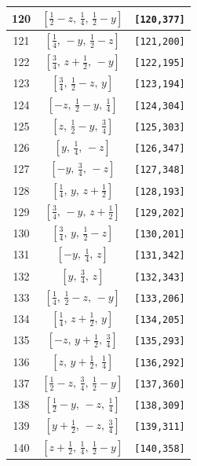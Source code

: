 \documentclass[fleqn,8pt]{jsarticle}
\begin{document}
\begin{longtable}{ccc}
120 & $\left[ \frac{1}{2} - z,\, \frac{1}{4},\, \frac{1}{2} - y \right]$ & {\tt [120,377]} \\ \hline
121 & $\left[ \frac{1}{4},\, - y,\, \frac{1}{2} - z \right]$ & {\tt [121,200]} \\ \hline
122 & $\left[ \frac{3}{4},\, z + \frac{1}{2},\, - y \right]$ & {\tt [122,195]} \\ \hline
123 & $\left[ \frac{3}{4},\, \frac{1}{2} - z,\, y \right]$ & {\tt [123,194]} \\ \hline
124 & $\left[ - z,\, \frac{1}{2} - y,\, \frac{1}{4} \right]$ & {\tt [124,304]} \\ \hline
125 & $\left[ z,\, \frac{1}{2} - y,\, \frac{3}{4} \right]$ & {\tt [125,303]} \\ \hline
126 & $\left[ y,\, \frac{1}{4},\, - z \right]$ & {\tt [126,347]} \\ \hline
127 & $\left[ - y,\, \frac{3}{4},\, - z \right]$ & {\tt [127,348]} \\ \hline
128 & $\left[ \frac{1}{4},\, y,\, z + \frac{1}{2} \right]$ & {\tt [128,193]} \\ \hline
129 & $\left[ \frac{3}{4},\, - y,\, z + \frac{1}{2} \right]$ & {\tt [129,202]} \\ \hline
130 & $\left[ \frac{3}{4},\, y,\, \frac{1}{2} - z \right]$ & {\tt [130,201]} \\ \hline
131 & $\left[ - y,\, \frac{1}{4},\, z \right]$ & {\tt [131,342]} \\ \hline
132 & $\left[ y,\, \frac{3}{4},\, z \right]$ & {\tt [132,343]} \\ \hline
133 & $\left[ \frac{1}{4},\, \frac{1}{2} - z,\, - y \right]$ & {\tt [133,206]} \\ \hline
134 & $\left[ \frac{1}{4},\, z + \frac{1}{2},\, y \right]$ & {\tt [134,205]} \\ \hline
135 & $\left[ - z,\, y + \frac{1}{2},\, \frac{3}{4} \right]$ & {\tt [135,293]} \\ \hline
136 & $\left[ z,\, y + \frac{1}{2},\, \frac{1}{4} \right]$ & {\tt [136,292]} \\ \hline
137 & $\left[ \frac{1}{2} - z,\, \frac{3}{4},\, \frac{1}{2} - y \right]$ & {\tt [137,360]} \\ \hline
138 & $\left[ \frac{1}{2} - y,\, - z,\, \frac{1}{4} \right]$ & {\tt [138,309]} \\ \hline
139 & $\left[ y + \frac{1}{2},\, - z,\, \frac{3}{4} \right]$ & {\tt [139,311]} \\ \hline
140 & $\left[ z + \frac{1}{2},\, \frac{1}{4},\, \frac{1}{2} - y \right]$ & {\tt [140,358]} \\ \hline

\end{longtable}
\end{document}
